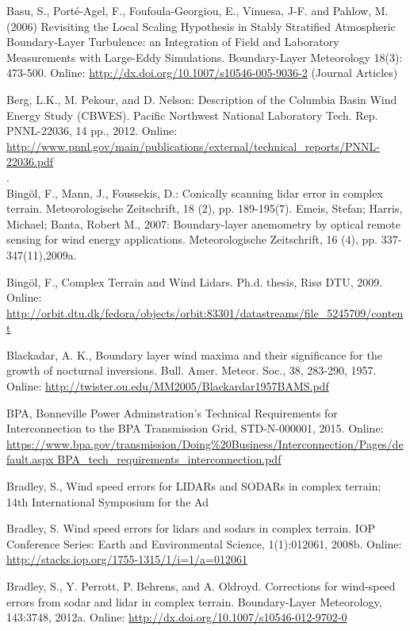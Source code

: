 Basu, S., Porté-Agel, F., Foufoula-Georgiou, E., Vinuesa, J-F. and Pahlow, M. (2006) Revisiting the Local Scaling Hypothesis in Stably Stratified Atmospheric Boundary-Layer Turbulence: an Integration of Field and Laboratory Measurements with Large-Eddy Simulations. Boundary-Layer Meteorology 18(3): 473-500.          
Online: \small{\url{http://dx.doi.org/10.1007/s10546-005-9036-2}} (Journal Articles)

Berg, L.K., M. Pekour, and D. Nelson: Description of the Columbia Basin Wind Energy Study (CBWES). Pacific Northwest National Laboratory Tech. Rep. PNNL-22036, 14 pp., 2012. Online: \small{\url{http://www.pnnl.gov/main/publications/external/technical_reports/PNNL-22036.pdf}}\\.\\

Bing{\"o}l, F., Mann, J., Foussekis, D.: Conically scanning lidar error in complex terrain. Meteorologische Zeitschrift, 18 (2), pp. 189-195(7). Emeis, Stefan; Harris, Michael; Banta, Robert M., 2007: Boundary-layer anemometry by optical remote sensing for wind energy applications. Meteorologische Zeitschrift, 16 (4), pp. 337-347(11),2009a.

Bingöl, F., Complex Terrain and Wind Lidars. Ph.d. thesis, Risø DTU, 2009. Online: \small{\url{http://orbit.dtu.dk/fedora/objects/orbit:83301/datastreams/file_5245709/content}}

Blackadar, A. K., Boundary layer wind maxima and their significance for the growth of nocturnal inversions. Bull. Amer. Meteor. Soc., 38, 283-290, 1957. Online: \small{\url{http://twister.ou.edu/MM2005/Blackardar1957BAMS.pdf}}

BPA, Bonneville Power Adminstration's Technical Requirements for Interconnection to the BPA Transmission Grid, STD-N-000001, 2015. 	Online: \small{\url{https://www.bpa.gov/transmission/Doing\%20Business/Interconnection/Pages/default.aspx BPA_tech_requirements_interconnection.pdf}}

Bradley, S., Wind speed errors for LIDARs and SODARs in complex terrain; 14th International Symposium for the Ad

Bradley, S. Wind speed errors for lidars and sodars in complex terrain. IOP Conference Series: Earth and Environmental Science, 1(1):012061, 2008b. Online: \small{\url{http://stacks.iop.org/1755-1315/1/i=1/a=012061}}

Bradley, S., Y. Perrott, P. Behrens, and A. Oldroyd. Corrections for wind-speed errors from sodar and lidar in complex terrain. Boundary-Layer Meteorology, 143:37­48, 2012a. 
Online: \small{\url{http://dx.doi.org/10.1007/s10546-012-9702-0}}

